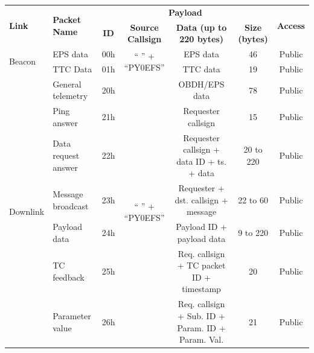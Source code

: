 \begin{landscape}
    \begin{table}[ht]
        \centering
        \begin{tabular}{llccccc}
            \toprule[1.5pt]
            \multirow{2}{*}{\textbf{Link}} & \multirow{2}{*}{\textbf{Packet Name}} & \multicolumn{4}{c}{\textbf{Payload}} & \multirow{2}{*}{\textbf{Access}} \\
            \cmidrule{3-6}
                                      &                       & \textbf{ID}  & \textbf{Source Callsign}   & \textbf{Data (up to 220 bytes)}                & \textbf{Size (bytes)} & \\
            \midrule
            \multirow{2}{*}{Beacon}   & EPS data              & 00h & \multirow{2}{*}{`` '' + ``PY0EFS''} & EPS data                                       & 46                    & Public \\
                                      & TTC Data              & 01h &                                     & TTC data                                       & 19                    & Public \\
            \midrule
            \multirow{7}{*}{Downlink} & General telemetry     & 20h & \multirow{7}{*}{`` '' + ``PY0EFS''} & OBDH/EPS data                                  & 78                    & Public \\
                                      & Ping answer           & 21h &                                     & Requester callsign                             & 15                    & Public \\
                                      & Data request answer   & 22h &                                     & Requester callsign + data ID + ts. + data      & 20 to 220             & Public \\
                                      & Message broadcast     & 23h &                                     & Requester + dst. callsign + message            & 22 to 60              & Public \\
                                      & Payload data          & 24h &                                     & Payload ID + payload data                      & 9 to 220              & Public \\
                                      & TC feedback           & 25h &                                     & Req. callsign + TC packet ID + timestamp       & 20                    & Public \\
                                      & Parameter value       & 26h &                                     & Req. callsign + Sub. ID + Param. ID + Param. Val. & 21                    & Public \\

\end{tabular}
\end{table}
\end{landscape}
